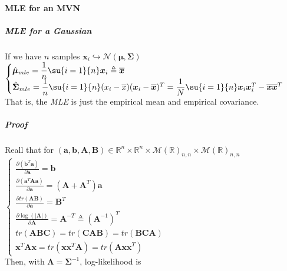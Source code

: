 \paragraph{MLE for an MVN}
\subparagraph{MLE for a Gaussian}
If we have $n$ samples $\bm{x}_{i} \hookrightarrow \mathcal{N}(\bm{\mu, \bm{\Sigma}})$\\
$\begin{cases}
    \hat{\bm{\mu}}_{mle} = \dfrac{1}{n}\su{i=1}{n}\bm{x}_{i} \triangleq 
    \overline{\bm{x}} \\
    \hat{\bm{\Sigma}}_{mle} = \dfrac{1}{n}\su{i=1}{n}(x_{i}-\overline{x})
    (\bm{x}_{i}-\overline{\bm{x}})^{T} = \dfrac{1}{N}\su{i=1}{n}
    \bm{x}_{i}\bm{x}_{i}^{T} - \overline{\bm{x}}\overline{\bm{x}}^{T}
\end{cases}$
That is, the \emph{MLE} is just the empirical mean and empirical covariance.
\subparagraph{Proof}
Reall that for $(\bm{a}, \bm{b}, \bm{A}, \bm{B}) \in \mathbb{R}^{n} \times \mathbb{R}^{n}
\times \mathcal{M}(\mathbb{R})_{n,n} \times \mathcal{M}(\mathbb{R})_{n,n}$ \\
$\begin{cases}
    \frac{\partial(\bm{b}^{T}\bm{a})}{\partial\bm{a}} = \bm{b}\\
    \frac{\partial(\bm{a}^{T}\bm{Aa})}{\partial\bm{a}} = (\bm{A} + \bm{A}^{T})\bm{a}\\
    \frac{\partial tr(\bm{AB})}{\partial\bm{a}} = \bm{B}^{T}\\
    \frac{\partial \log(|\bm{A}|)}{\partial\bm{A}} = \bm{A}^{-T} \triangleq 
    (\bm{A}^{-1})^{T}\\
    tr(\bm{ABC}) = tr(\bm{CAB}) = tr(\bm{BCA})\\
    \bm{x}^{T}\bm{A}\bm{x} = tr(\bm{xx}^{T}\bm{A}) = tr(\bm{Axx}^{T})
\end{cases}$\\
Then, with $\bm{\Lambda} = \bm{\Sigma}^{-1}$, log-likelihood is
